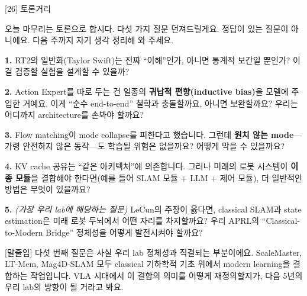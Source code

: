 \documentclass[aspectratio=169,10pt]{beamer}
\newenvironment{script}{%
  \footnotesize
  \setlength{\parskip}{0.5em}
  \setlength{\parindent}{0pt}
}{}
\begin{document}
\begin{frame}{[26] 토론거리}
\begin{script}
오늘 마무리는 토론으로 합시다. 다섯 가지 질문 던져드릴게요. 정답이 있는 질문이 아니에요. 다음 주까지 자기 생각 정리해 와 주세요.

\textbf{1.} RT2의 일반화(Taylor Swift)는 진짜 ``이해''인가, 아니면 통계적 보간일 뿐인가? 이걸 검증할 실험을 설계할 수 있을까?

\textbf{2.} Action Expert를 따로 두는 건 일종의 \textbf{귀납적 편향(inductive bias)}을 모델에 주입한 거예요. 이게 ``순수 end-to-end'' 철학과 충돌할까요, 아니면 보완할까요? 우리는 어디까지 architecture를 손봐야 할까요?

\textbf{3.} Flow matching이 mode collapse를 피한다고 했습니다. 그런데 \textbf{원치 않는 mode}---가령 안전하지 않은 동작---도 학습될 위험은 없을까요? 어떻게 막을 수 있을까요?

\textbf{4.} KV cache 공유는 ``같은 아키텍처''에 의존합니다. 그러나 미래의 로봇 시스템이 \textbf{이종 모듈}을 결합해야 한다면(예를 들어 SLAM 모듈 + LLM + 제어 모듈), 더 일반적인 방법은 무엇이 있을까요?

\textbf{5.} \textit{(가장 우리 lab에 해당하는 질문)} LeCun의 주장이 옳다면, classical SLAM과 state estimation은 미래 로봇 두뇌에서 어떤 자리를 차지할까요? 우리 APRL의 ``Classical-to-Modern Bridge'' 정체성을 어떻게 발전시켜야 할까요?

[말줄임] 다섯 번째 질문은 사실 우리 lab 정체성과 직결되는 부분이에요. ScaleMaster, LT-Mem, Mag4D-SLAM 모두 classical 기하학적 기초 위에서 modern learning을 결합하는 작업입니다. VLA 시대에서 이 결합의 의미를 어떻게 재정의할지가, 다음 5년의 우리 lab의 방향이 될 거라고 봐요.
\end{script}
\end{frame}
\end{document}
